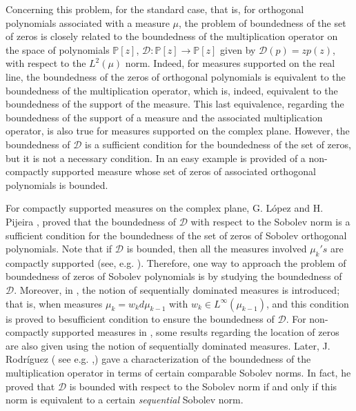 \documentclass[12pt]{amsart}
\theoremstyle{definition}
\theoremstyle{plain}
\theoremstyle{remark}
\begin{document}
\bigskip 

\noindent Concerning this problem, for the standard case, that is, for orthogonal polynomials associated with a measure $\mu$, the problem of boundedness of the set of zeros is closely related to the boundedness of the multiplication operator on the space of polynomials $\mathbb{P}[z]$,  $\mathcal{D}: \mathbb{P}[z]\to \mathbb{P}[z]$ given by $\mathcal{D}(p)=zp(z)$,   with respect to the $L^{2}(\mu)$ norm. Indeed, for measures supported on the real line, the boundedness of the zeros of orthogonal polynomials is equivalent to the boundedness of the multiplication operator, which is, indeed, equivalent to the boundedness of the support of the measure. This last equivalence, regarding the boundedness of the support of a measure and the associated multiplication operator, is also true for measures supported on the complex plane. However, the boundedness of $\mathcal{D}$  is a sufficient condition for the boundedness of the set of zeros, but it is not a necessary condition. In \cite{Castro-Duran} an easy example is provided of a non-compactly supported measure whose set of zeros of associated orthogonal polynomials is bounded. 


\noindent For compactly supported measures on the complex plane,  G. L\'{o}pez and H. Pijeira \cite{LP}, proved that the boundedness of $\mathcal{D}$ with respect to the Sobolev norm is a sufficient condition for the boundedness of the set of zeros of Sobolev orthogonal polynomials. Note that if $\mathcal{D}$ is bounded, then all the measures involved $\mu_k's$ are compactly supported (see, e.g. \cite{Castro-Duran} ). Therefore, one way to approach the problem of boundedness of zeros of Sobolev polynomials is by studying the  boundedness of $\mathcal{D}$. Moreover, in \cite{LP}, the notion of sequentially dominated measures is introduced; that is, when measures $\mu_k=w_kd\mu_{k-1}$ with $w_k\in L^{\infty}(\mu_{k-1})$, and this condition is proved to besufficient condition to ensure the boundedness of $\mathcal{D}$. 
For non-compactly supported measures in \cite{Duran-Saff}, some results regarding the location of zeros are also given using the notion of sequentially dominated measures. Later, J. Rodríguez ( see e.g. \cite{JR1},\cite{JR3}) gave a characterization of the boundedness of the multiplication operator in terms of certain comparable Sobolev norms. In fact, he proved that $\mathcal{D}$ is bounded with respect to the Sobolev norm if and only if this norm is equivalent to a certain {\it sequential}  Sobolev norm. 
\end{document}
